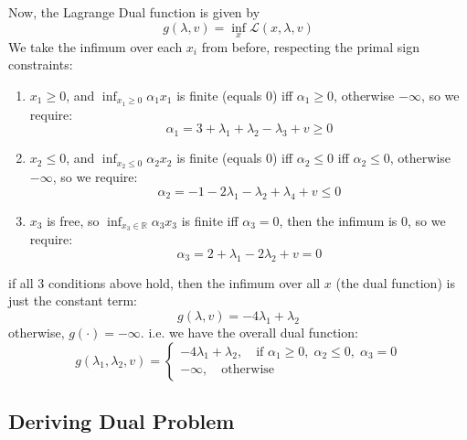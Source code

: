 \documentclass[12pt]{article}
\begin{document}
Now, the Lagrange Dual function is given by \begin{equation}
    g(\lambda, v) = \inf_x \mathcal{L} (x, \lambda, v)
\end{equation} We take the infimum over each $x_i$ from before, respecting the primal sign constraints: \begin{enumerate}
    \item $x_{1} \geq 0$, and $\inf_{x_{1}\geq 0} \alpha_1 x_{1}$ is finite (equals 0) iff $\alpha_1 \geq 0$, otherwise $-\infty$, so we require: \begin{equation*}
        \alpha_1 = 3 + \lambda_1 + \lambda_2 - \lambda_3 + v \geq 0
    \end{equation*}
    \item $x_{2} \leq 0$, and $\inf_{x_{2}\leq 0} \alpha_2 x_{2}$ is finite (equals 0) iff $\alpha_2 \leq 0$ iff $\alpha_2 \leq 0$, otherwise $-\infty$, so we require: \begin{equation*}
        \alpha_2 = -1 -2 \lambda_1 - \lambda_2 + \lambda_4 + v \leq 0
    \end{equation*}
    \item $x_{3}$ is free, so $\inf_{x_{3}\in \mathbb{R}}\alpha_3 x_{3}$ is finite iff $\alpha_3 =0$, then the infimum is 0, so we require: \begin{equation*}
        \alpha_3 = 2 + \lambda_1 -2\lambda_2 + v = 0
    \end{equation*}
\end{enumerate} if all 3 conditions above hold, then the infimum over all $x$ (the dual function) is just the constant term: \begin{equation*}
    g(\lambda, v) = -4 \lambda_1 + \lambda_2 
\end{equation*} otherwise, $g(\cdot) = -\infty$. i.e. we have the overall dual function: \begin{equation}
    g(\lambda_1, \lambda_2, v) = \begin{cases}
        -4 \lambda_1 + \lambda_2, \quad \text{if } \alpha_1 \geq 0,\; \alpha_2 \leq 0,\; \alpha_3 = 0 \\ 
        -\infty, \quad \text{otherwise}
    \end{cases}
\end{equation}

\subsection*{Deriving Dual Problem}
\end{document}

